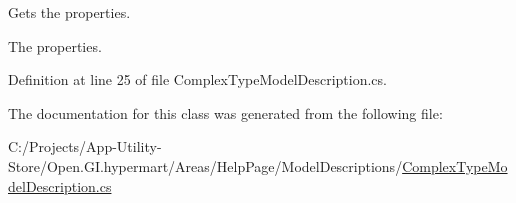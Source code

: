Gets the properties. 

The properties. 

Definition at line 25 of file Complex\+Type\+Model\+Description.\+cs.



The documentation for this class was generated from the following file\+:\begin{DoxyCompactItemize}
\item 
C\+:/\+Projects/\+App-\/\+Utility-\/\+Store/\+Open.\+G\+I.\+hypermart/\+Areas/\+Help\+Page/\+Model\+Descriptions/\hyperlink{_complex_type_model_description_8cs}{Complex\+Type\+Model\+Description.\+cs}\end{DoxyCompactItemize}
